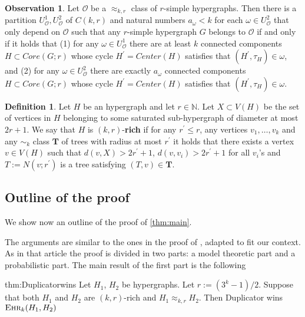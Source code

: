 \documentclass[12pt,notitlepage,a4paper]{article}
\theoremstyle{definition}
\newtheorem{obs}{Observation}[section]
\newtheorem{definition}{Definition}[section]
\newcommand{\N}{\mathbb{N}}
\newcommand{\ehr}{\textsc{Ehr}}
\begin{document}
\begin{obs}\label{obs:agreeablecores}
	Let $\mathcal{O}$ be a $\approx_{k,r}$ class
	of $r$-simple hypergraphs. 
	Then there is a partition $U^1_\mathcal{O},
	U^2_\mathcal{O}$ of $C(k,r)$ and natural numbers $a_\omega<k$
	for each $\omega\in U^2_\mathcal{O}$ that only depend on 
	$\mathcal{O}$ such that any $r$-simple hypergraph $G$ belongs to
	$\mathcal{O}$ if and only if it holds that (1) for any $\omega\in U^1_\mathcal{O}$ 
	there are at least $k$ connected components $H \subset Core(G;r)$ whose cycle 		
	$H^\prime=Center(H)$ satisfies that	$(H^{\prime},\tau_{H})\in \omega$, and
	(2) for any $\omega\in U^2_\mathcal{O}$ there are exactly $a_\omega$ 
	connected components $H \subset Core(G;r)$ whose cycle 
	$H^\prime=Center(H)$ satisfies that	$(H^{\prime},\tau_{H})\in \omega$.	
\end{obs}

\begin{definition} \label{def:rich}
	Let $H$ be an hypergraph and let $r\in\N$. Let
	$X\subset V(H)$ be the set of vertices in $H$
	belonging to some saturated sub-hypergraph of diameter
	at most $2r+1$.	We say that $H$ is $(k,r)$-\textbf{rich}
	if for any $r^\prime\leq r$, any vertices $v_1,\dots, v_k$ 
	and any $\sim_k$ class $\mathbf{T}$ of trees with radius
	at most $r^\prime$ it holds that there exists a vertex $v\in V(H)$
	such that $d(v,X)> 2r^\prime+1$, $d(v,v_i)>2r^\prime+1$ for all
	$v_i$'s and $T:=N(v;r^\prime)$ is a tree satisfying
	$(T,v)\in \mathbf{T}$.	
\end{definition}





\subsection{Outline of the proof}

We show now an outline of the proof of \cref{thm:main}. \par 
The arguments are similar to the ones in the proof of
 \cite[Theorem 2.1]{lynch1992probabilities},
adapted to fit our context. As in that
article the proof is divided in two parts: a model theoretic part and a 
probabilistic part. The main result of the first part is the following

\begin{reptheorem}{thm:Duplicatorwins}
	Let $H_1$, $H_2$ be hypergraphs. Let $r:=(3^k-1)/2$. Suppose
	that both $H_1$ and $H_2$ are $(k,r)$-rich and
	$H_1\approx_{k,r} H_2$. Then Duplicator wins $\ehr_{k}(H_1,H_2)$
\end{reptheorem}
\end{document}
